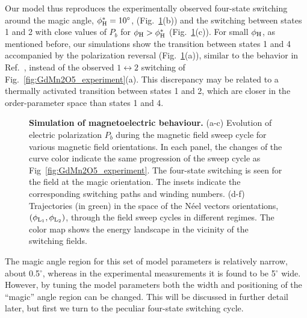 Our model thus reproduces the experimentally observed four-state switching around the magic angle, $\phi_{\rm H}^\ast  = 10^\circ$, (Fig.~\ref{fig:GdMn2O5_theory}(b)) and the switching between states 1 and 2 with close values of $P_b$ for $\phi_{\rm H} > \phi_{\rm H}^\ast$  (Fig.~\ref{fig:GdMn2O5_theory}(c)).
For small $\phi_{\rm H}$, as mentioned before, our simulations show the transition between states 1 and 4 accompanied by the polarization reversal (Fig.~\ref{fig:GdMn2O5_theory}(a)), similar to the behavior in Ref.~\cite{Lee13}, instead of the observed $1\leftrightarrow2$ switching of Fig.~\ref{fig:GdMn2O5_experiment}(a). 
This discrepancy may be related to a thermally activated transition between states 1 and 2, which are closer in the order-parameter space than states 1 and 4.
\begin{figure}[b!]
    \caption{\label{fig:GdMn2O5_theory}{\bf Simulation of magnetoelectric behaviour.}
    (a-c) Evolution of electric polarization $P_b$ during the magnetic field sweep cycle for various magnetic field orientations. 
   In each panel, the changes of the curve color indicate the same progression of the sweep cycle as Fig~\ref{fig:GdMn2O5_experiment}. The four-state switching is seen for the field at the magic orientation. 
    The insets indicate the corresponding switching paths and winding numbers.
    (d-f) Trajectories (in green) in the space of the N\'eel vectors orientations, $(\phi_{\rm L_1},\phi_{\rm L_2})$, through the field sweep cycles in different regimes. The color map shows the energy landscape in the vicinity of the switching fields. 
}
\end{figure}

The magic angle region for this set of model parameters is relatively narrow, about 0.5$^\circ$, whereas in the experimental measurements it is found to be 5$^\circ$ wide.
However, by tuning the model parameters both the width and positioning of the ``magic'' angle region can be changed.
This will be discussed in further detail later, but first we turn to the peculiar four-state switching cycle.

